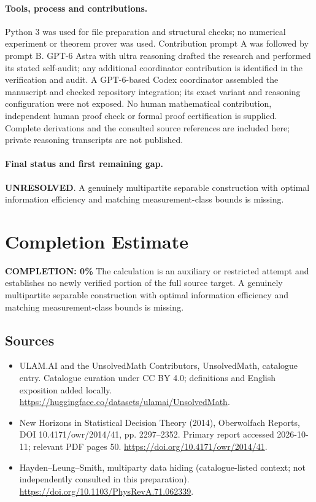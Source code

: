 \documentclass[11pt]{article}
\begin{document}
\paragraph{Tools, process and contributions.}
Python 3 was used for file preparation and structural checks; no numerical experiment or theorem prover was used. Contribution prompt A was followed by prompt B. GPT-6 Astra with ultra reasoning drafted the research and performed its stated self-audit; any additional coordinator contribution is identified in the verification and audit. A GPT-6-based Codex coordinator assembled the manuscript and checked repository integration; its exact variant and reasoning configuration were not exposed. No human mathematical contribution, independent human proof check or formal proof certification is supplied. Complete derivations and the consulted source references are included here; private reasoning transcripts are not published.

\paragraph{Final status and first remaining gap.}
\textbf{UNRESOLVED}. A genuinely multipartite separable construction with optimal information efficiency and matching measurement-class bounds is missing.

\section{Completion Estimate}
\noindent\textbf{COMPLETION: 0\%}
The calculation is an auxiliary or restricted attempt and establishes no newly verified portion of the full source target. A genuinely multipartite separable construction with optimal information efficiency and matching measurement-class bounds is missing.

\subsection{Sources}
\begin{itemize}
\item[\hypertarget{source:statement:1}{S1}] ULAM.AI and the UnsolvedMath Contributors, UnsolvedMath, catalogue entry. Catalogue curation under CC BY 4.0; definitions and English exposition added locally.
\url{https://huggingface.co/datasets/ulamai/UnsolvedMath}.
\item[\hypertarget{source:statement:2}{S2}] New Horizons in Statistical Decision Theory (2014), Oberwolfach Reports, DOI 10.4171/owr/2014/41, pp. 2297--2352. Primary report accessed 2026-10-11; relevant PDF pages 50.
\url{https://doi.org/10.4171/owr/2014/41}.
\item[\hypertarget{source:statement:3}{S3}] Hayden--Leung--Smith, multiparty data hiding (catalogue-listed context; not independently consulted in this preparation).
\url{https://doi.org/10.1103/PhysRevA.71.062339}.
\end{itemize}
\label{end:statement}
\end{document}
